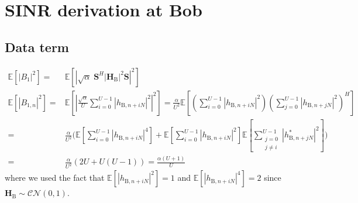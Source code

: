 \documentclass[12pt, draftclsnofoot, onecolumn]{IEEEtran}
\let\MYoriglatexcaption\caption
\renewcommand{\caption}[2][\relax]{\MYoriglatexcaption[#2]{#2}}
\newcommand{\module}[1]{\left|#1\right|}
\newcommand{\EX}[1]{\mathbb{E} \left[#1\right]}%
\newcommand{\HB}{\textbf{H}_{\text{B}}}
\newcommand{\spread}{\textbf{S}}
\begin{document}








\appendices
\section{SINR derivation at Bob}\label{sec:sinr-derivation-app}


\subsection{Data term}\label{sec:data-term-app}
\begin{equation}
	\begin{split}
		\EX{|B_1|^2} =& \EX{\module{\sqrt{\alpha} \; \spread^H \module{\HB}^2 \spread}^2} \\
		\EX{|B_{1,n}|^2} =&\EX{\left|\frac{\sqrt{\alpha}}{U}\sum_{i=0}^{U-1} \left| h_{\text{B}, n + iN}\right|^2\right|^2}  =\frac{\alpha}{U^2} \EX{\left(\sum_{i=0}^{U-1} \left| h_{\text{B}, n + iN}\right|^2\right) \left(\sum_{j=0}^{U-1} \left| h_{\text{B}, n + jN}\right|^2\right)^H}\\
		=&  \frac{\alpha}{U^2} \Big(\EX{\sum_{i=0}^{U-1}\left| h_{\text{B}, n + iN}\right|^4} +\EX{\sum_{i=0}^{U-1}\left| h_{\text{B}, n + iN}\right|^2}\EX{\sum_{\substack{j=0 \\ j\neq i}}^{U-1} | h^*_{\text{B}, n + jN}|^2} \Big) \\
		=& \frac{\alpha}{U^2} \left( 2U + U(U-1)\right) = \frac{\alpha (U+1)}{U}
	\end{split}
	\label{eq:appA:data_bob-app}
\end{equation}
where we used the fact that $\EX{\left| h_{\text{B}, n + iN}\right|^2} = 1$ and $\EX{\left| h_{\text{B}, n + iN}\right|^4} = 2$ since $\HB \sim \mathcal{CN}(0,1)$.
\end{document}

